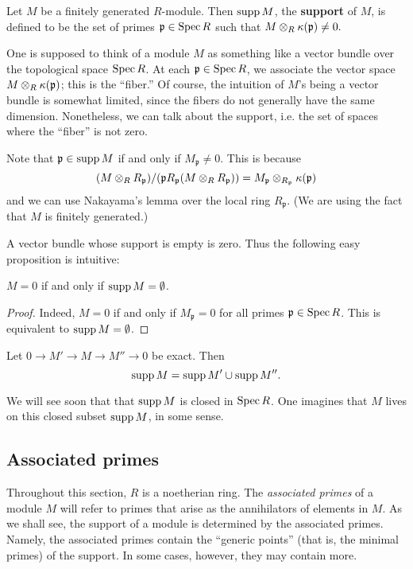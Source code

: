 \begin{definition} 
Let $M$ be a finitely generated $R$-module. Then $\operatorname{supp} M$, the
\textbf{support} of $M$,  is defined to be the set of primes
$\mathfrak{p} \in \operatorname{Spec} R$ such that
\( M \otimes_R \kappa(\mathfrak{p}) \neq 0.  \)
\end{definition} 

One is  supposed to think of a module $M$ as something like a vector bundle
over the topological space
$\operatorname{Spec} R$. At each $\mathfrak{p} \in \operatorname{Spec} R$, we associate the vector space $M
\otimes_R \kappa(\mathfrak{p})$; this is the ``fiber.'' Of course, the intuition
of  $M$'s being a vector bundle is somewhat limited, since the fibers
do not generally have  the same dimension.
Nonetheless, we can talk about the support, i.e. the set of spaces where the
``fiber'' is not zero.

Note that $\mathfrak{p} \in \operatorname{supp} M$ if and only if $M_{\mathfrak{p}} \neq 0$. This is
because
\[ (M \otimes_R R_{\mathfrak{p}})/( \mathfrak{p} R_{\mathfrak{p}} (M \otimes_R
R_{\mathfrak{p}}))  = M_{\mathfrak{p}}
\otimes_{R_{\mathfrak{p}}} \kappa(\mathfrak{p})  \]
and we can use Nakayama's lemma over the local ring $R_{\mathfrak{p}}$.  (We
are using the fact that $M$ is finitely generated.)

A vector bundle whose support is empty is zero. Thus the following easy
proposition is intuitive:

\begin{proposition} 
$M = 0$ if and only if $\operatorname{supp} M = \emptyset$. 
\end{proposition}
\begin{proof} 
Indeed, $M=0$ if and only if $M_{\mathfrak{p}} = 0$ for all primes
$\mathfrak{p} \in \operatorname{Spec} R$. This is equivalent to $\operatorname{supp} M = \emptyset$.
\end{proof} 
 
\begin{exercise} 
Let $0 \to M' \to M \to M'' \to 0$ be exact. Then 
\[ \operatorname{supp} M = \operatorname{supp} M' \cup \operatorname{supp} M''.  \]
\end{exercise} 


We will see soon that that $\operatorname{supp} M$ is closed in $\operatorname{Spec} R$. One imagines that
$M$ lives on this closed subset $\operatorname{supp} M$, in some sense.



\subsection{Associated primes}
Throughout this section, $R$ is a noetherian ring. The \emph{associated
primes} of a module $M$ will refer to primes that arise as the annihilators of
elements in $M$. As we shall see, the support of  a module is determined by
the associated primes. Namely, the associated primes contain the ``generic
points'' (that is, the minimal primes) of the support. In some cases, however,
they may contain more. 

